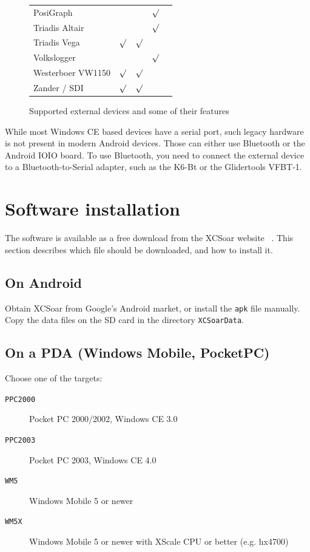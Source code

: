 \begin{figure}
\begin{tabular}{l|cccc}
PosiGraph &&& $\surd$ \\

Triadis Altair &&& $\surd$ \\

Triadis Vega & $\surd$ & $\surd$ \\

Volkslogger &&& $\surd$ \\

Westerboer VW1150 & $\surd$ & $\surd$ \\

Zander / SDI & $\surd$ & $\surd$ \\

\end{tabular}
\caption{Supported external devices and some of their features}
\end{figure}

While most Windows CE based devices have a serial port, such legacy
hardware is not present in modern Android devices.  Those can either
use Bluetooth or the Android IOIO board.  To use Bluetooth, you need
to connect the external device to a Bluetooth-to-Serial adapter, such
as the K6-Bt or the Glidertools VFBT-1.


\section{Software installation}

The software is available as a free download from the XCSoar website
~\xcsoarwebsite.  This section describes which file should be
downloaded, and how to install it.

\subsection*{On Android}

Obtain XCSoar from Google's Android market, or install the \verb|apk|
file manually.  Copy the data files on the SD card in the directory
\verb|XCSoarData|.

\subsection*{On a PDA (Windows Mobile, PocketPC)}

Choose one of the targets:

\begin{description}
\item[\texttt{PPC2000}] Pocket PC 2000/2002, Windows CE 3.0
\item[\texttt{PPC2003}] Pocket PC 2003, Windows CE 4.0
\item[\texttt{WM5}] Windows Mobile 5 or newer
\item[\texttt{WM5X}] Windows Mobile 5 or newer with XScale CPU or
  better (e.g. hx4700)
\end{description}

